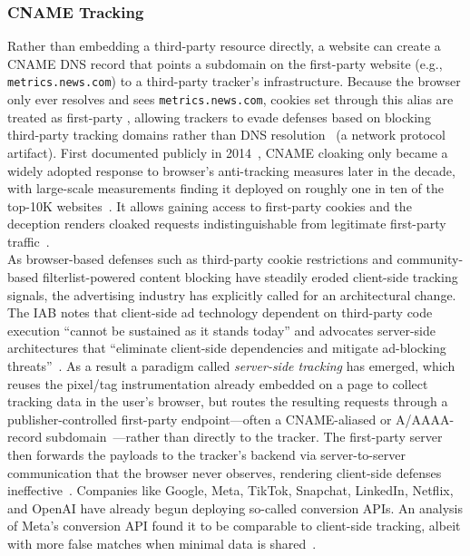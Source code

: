 \subsubsection{CNAME Tracking}
\label{sec:stateful-techniques-cname}
Rather than embedding a third-party resource directly, a website can create a CNAME DNS record that points a subdomain on the first-party website (e.g., \texttt{metrics.news.com}) to a third-party tracker's infrastructure.
%
Because the browser only ever resolves and sees \texttt{metrics.news.com}, cookies set through this alias are treated as first-party \symStorage, allowing trackers to evade defenses based on blocking third-party tracking domains rather than DNS resolution~\cite{dimovaCNAMEGameLargescale2021} (a network protocol artifact).
%
First documented publicly in 2014~\cite{olejnikSellingPrivacyAuction2014,olejnikBidNotBid2014}, CNAME cloaking only became a widely adopted response to browser's anti-tracking measures later in the decade, with large-scale measurements finding it deployed on roughly one in ten of the top-10K websites~\cite{dimovaCNAMEGameLargescale2021}.
%
It allows gaining access to first-party cookies and the deception renders cloaked requests indistinguishable from legitimate first-party traffic~\cite{dimovaCNAMEGameLargescale2021,chenCookieSwapParty2021}.\\



As browser-based defenses such as third-party cookie restrictions and community-based filterlist-powered content blocking have steadily eroded client-side tracking signals, the advertising industry has explicitly called for an architectural change. 
%
The IAB notes that client-side ad technology dependent on third-party code execution ``cannot be sustained as it stands today'' and advocates server-side architectures that ``eliminate client-side dependencies and mitigate ad-blocking threats''~\cite{iabtechlabTechLabTrusted2025}.
%
As a result a paradigm called \emph{server-side tracking} has emerged, which reuses the pixel/tag instrumentation already embedded on a page to collect tracking data in the user's browser, but routes the resulting requests through a publisher-controlled first-party endpoint---often a CNAME-aliased or A/AAAA-record subdomain~\cite{jazlanSSTGuardDetectingCharacterizing2026}---rather than directly to the tracker. 
%
The first-party server then forwards the payloads to the tracker's backend via server-to-server communication that the browser never observes, rendering client-side defenses ineffective~\cite{fouadDevilDetailsDetection2024}.
%
Companies like Google, Meta, TikTok, Snapchat, LinkedIn, Netflix, and OpenAI have already begun deploying so-called conversion APIs. 
%
An analysis of Meta’s conversion API found it to be comparable to client-side tracking, albeit with more false matches when minimal data is shared~\cite{fraihiClientsideServersideTracking2024}.

